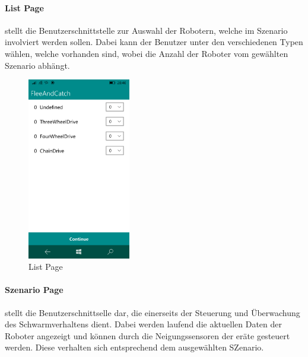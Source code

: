 \newpage
\paragraph{List Page} stellt die Benutzerschnittstelle zur Auswahl der Robotern, welche im Szenario involviert werden sollen. Dabei kann der Benutzer unter den verschiedenen Typen wählen, welche vorhanden sind, wobei die Anzahl der Roboter vom gewählten Szenario abhängt.

\begin{figure}[h]
	\begin{center}
		\includegraphics[width=0.4\textwidth]{images/implementation/list.png}
	\end{center}	
	\caption{List Page}
	\label{fig:list}
\end{figure}

\newpage
\paragraph{Szenario Page} stellt die Benutzerschnittselle dar, die einerseits der Steuerung und Überwachung des Schwarmverhaltens dient. Dabei werden laufend die aktuellen Daten der Roboter angezeigt und können durch die Neigungssensoren der eräte gesteuert werden. Diese verhalten sich entsprechend dem ausgewählten SZenario.

